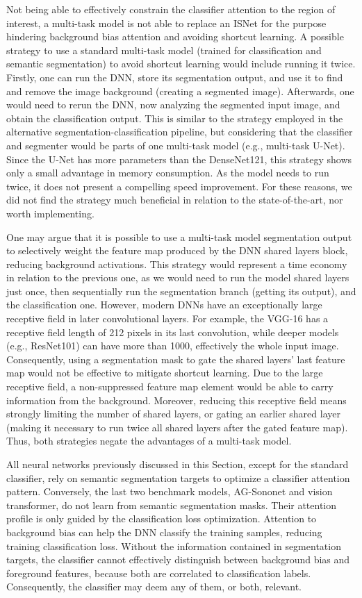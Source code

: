 \documentclass[fleqn,10pt]{wlscirep}
\begin{document}
{Not being able to effectively constrain the classifier attention to the region of interest, a multi-task model is not able to replace an ISNet for the purpose hindering background bias attention and avoiding shortcut learning. A possible strategy to use a standard multi-task model (trained for classification and semantic segmentation) to avoid shortcut learning would include running it twice. Firstly, one can run the DNN, store its segmentation output, and use it to find and remove the image background (creating a segmented image). Afterwards, one would need to rerun the DNN, now analyzing the segmented input image, and obtain the classification output. This is similar to the strategy employed in the alternative segmentation-classification pipeline, but considering that the classifier and segmenter would be parts of one multi-task model (e.g., multi-task U-Net). Since the U-Net has more parameters than the DenseNet121, this strategy shows only a small advantage in memory consumption. As the model needs to run twice, it does not present a compelling speed improvement. For these reasons, we did not find the strategy much beneficial in relation to the state-of-the-art, nor worth implementing.

One may argue that it is possible to use a multi-task model segmentation output to selectively weight the feature map produced by the DNN shared layers block, reducing background activations. This strategy would represent a time economy in relation to the previous one, as we would need to run the model shared layers just once, then sequentially run the segmentation branch (getting its output), and the classification one. However, modern DNNs have an exceptionally large receptive field in later convolutional layers. For example, the VGG-16 has a receptive field length of 212 pixels in its last convolution, while deeper models (e.g., ResNet101) can have more than 1000, effectively the whole input image\cite{ReceptiveField}. Consequently, using a segmentation mask to gate the shared layers' last feature map would not be effective to mitigate shortcut learning. Due to the large receptive field, a non-suppressed feature map element would be able to carry information from the background. Moreover, reducing this receptive field means strongly limiting the number of shared layers, or gating an earlier shared layer (making it necessary to run twice all shared layers after the gated feature map). Thus, both strategies negate the advantages of a multi-task model.

All neural networks previously discussed in this Section, except for the standard classifier, rely on semantic segmentation targets to optimize a classifier attention pattern. Conversely, the last two benchmark models, AG-Sononet and vision transformer, do not learn from semantic segmentation masks. Their attention profile is only guided by the classification loss optimization. Attention to background bias can help the DNN classify the training samples, reducing training classification loss. Without the information contained in segmentation targets, the classifier cannot effectively distinguish between background bias and foreground features, because both are correlated to classification labels. Consequently, the classifier may deem any of them, or both, relevant.

}
\end{document}
